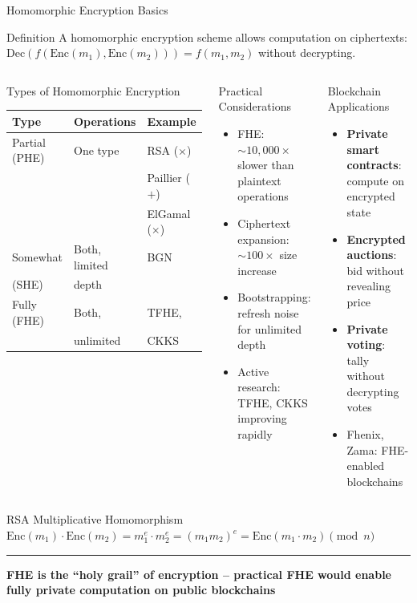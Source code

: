 \documentclass[8pt,aspectratio=169]{beamer}
\newcommand{\bottomnote}[1]{\vfill\vspace{-2mm}\textcolor{mllavender2}{\rule{\textwidth}{0.4pt}}\vspace{1mm}\footnotesize\textbf{#1}}
\begin{document}
\begin{frame}{Homomorphic Encryption Basics}
\begin{block}{Definition}
\small A homomorphic encryption scheme allows computation on ciphertexts: $\text{Dec}(f(\text{Enc}(m_1), \text{Enc}(m_2))) = f(m_1, m_2)$ without decrypting.
\end{block}
\vspace{2mm}
\begin{columns}
\begin{block}{Types of Homomorphic Encryption}
\small
\begin{tabular}{lll}
\toprule
\textbf{Type} & \textbf{Operations} & \textbf{Example} \\
\midrule
Partial (PHE) & One type & RSA ($\times$) \\
 & & Paillier ($+$) \\
 & & ElGamal ($\times$) \\
\midrule
Somewhat & Both, limited & BGN \\
(SHE) & depth & \\
\midrule
Fully (FHE) & Both, & TFHE, \\
 & unlimited & CKKS \\
\bottomrule
\end{tabular}
\end{block}
\begin{block}{Practical Considerations}
\begin{itemize}\small
  \item FHE: $\sim 10{,}000\!\times$ slower than plaintext operations
  \item Ciphertext expansion: $\sim 100\!\times$ size increase
  \item Bootstrapping: refresh noise for unlimited depth
  \item Active research: TFHE, CKKS improving rapidly
\end{itemize}
\end{block}
\vspace{1mm}
\begin{block}{Blockchain Applications}
\begin{itemize}\small
  \item \textbf{Private smart contracts}: compute on encrypted state
  \item \textbf{Encrypted auctions}: bid without revealing price
  \item \textbf{Private voting}: tally without decrypting votes
  \item Fhenix, Zama: FHE-enabled blockchains
\end{itemize}
\end{block}
\end{columns}
\vspace{1mm}
\begin{alertblock}{RSA Multiplicative Homomorphism}
\small $\text{Enc}(m_1) \cdot \text{Enc}(m_2) = m_1^e \cdot m_2^e = (m_1 m_2)^e = \text{Enc}(m_1 \cdot m_2) \pmod{n}$
\end{alertblock}
\bottomnote{FHE is the ``holy grail'' of encryption -- practical FHE would enable fully private computation on public blockchains}
\end{frame}
\end{document}
